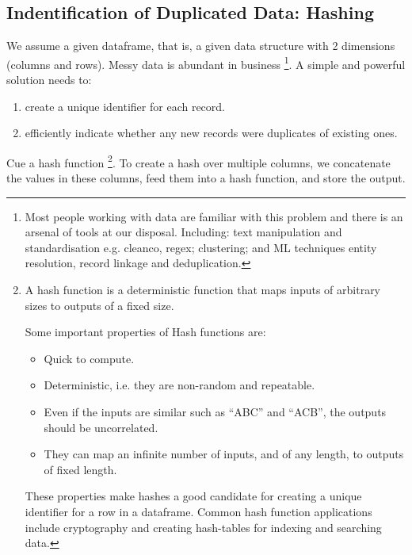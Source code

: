 \subsection{Indentification of Duplicated Data: Hashing}
We assume a given dataframe, that is, a given data structure with
2 dimensions (columns and rows). Messy data is abundant in business
\footnote{
    Most people working with data are familiar with this problem and
    there is an arsenal of tools at our disposal. Including:
    text manipulation and standardisation e.g. cleanco,
    regex; clustering; and ML techniques entity 
    resolution, record linkage and deduplication.
}.
A simple and powerful solution needs to:
\begin{enumerate}
    \item create a unique identifier for each record.
    \item efficiently indicate whether any new records were 
    duplicates of existing ones.
\end{enumerate}
Cue a hash function
\footnote{
    A hash function is a deterministic function that maps inputs of
    arbitrary sizes to outputs of a fixed size.

    Some important properties of Hash functions are:
    \begin{itemize}
        \item Quick to compute.
        \item Deterministic, i.e. they are non-random and repeatable.
        \item Even if the inputs are similar such as “ABC” and “ACB”,
        the outputs should be uncorrelated.
        \item They can map an infinite number of inputs, and of any
        length, to outputs of fixed length.
    \end{itemize}

    These properties make hashes a good candidate for creating a
    unique identifier for a row in a dataframe. Common hash function
    applications include cryptography and creating hash-tables for
    indexing and searching data.
}.
To create a hash over multiple columns, we concatenate the values in
these columns, feed them into a hash function, and store the output.
